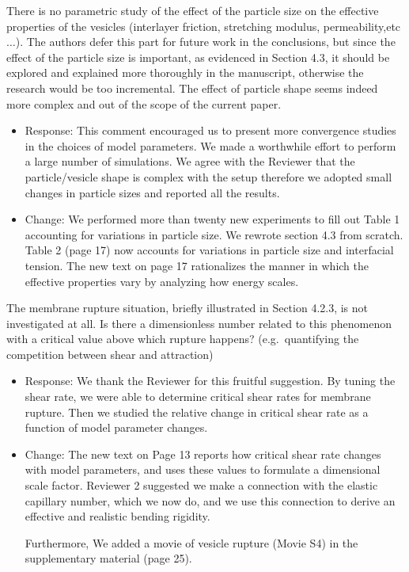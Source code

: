 \documentclass[11pt]{article}
\newcommand{\comment}[1]{{\color{blue} #1}}
\begin{document}
\noindent
\comment{There is no parametric study of the effect of the particle size
on the effective properties of the vesicles (interlayer friction,
stretching modulus, permeability,etc$\ldots$). The authors defer this
part for future work in the conclusions, but since the effect of the
particle size is important, as evidenced in Section 4.3, it should be
explored and explained more thoroughly in the manuscript, otherwise the
research would be too incremental. The effect of particle shape seems
indeed more complex and out of the scope of the current paper.}
\begin{itemize}
\item Response: This comment encouraged us to present more convergence
  studies in the choices of model parameters. We made a worthwhile
  effort to perform a large number of simulations. We agree with the
  Reviewer that the particle/vesicle shape is complex with the setup
  therefore we adopted small changes in particle sizes and reported all the results.
\item Change: We performed more than twenty new experiments to fill out Table 1
  accounting for variations in particle size.  
  We rewrote section 4.3 from scratch. 
  Table 2 (page 17) now accounts for variations in particle size
  and interfacial tension. The new text on page 17 rationalizes
  the manner in which the effective properties vary by analyzing
  how energy scales. 
\end{itemize}

\noindent
\comment{The membrane rupture situation, briefly illustrated in Section
4.2.3, is not investigated at all. Is there a dimensionless number
related to this phenomenon with a critical value above which rupture
happens? (e.g.~quantifying the competition between shear and
attraction)}

\begin{itemize}
\item Response: We thank the Reviewer for this fruitful suggestion.
  By tuning the shear rate, we were able to determine critical
  shear rates for membrane rupture.  Then we studied the relative
  change in critical shear rate as a function of model parameter
  changes.
\item Change:
  The new text on Page 13 reports how critical shear rate changes
  with model parameters, and uses these values to formulate
  a dimensional scale factor.  Reviewer 2 suggested we make
  a connection with the elastic capillary number, which we now do,
  and we use this connection to derive an effective and realistic
  bending rigidity.

  Furthermore, We added a movie of vesicle rupture (Movie S4) in the supplementary material (page 25).
\end{itemize}
\end{document}

